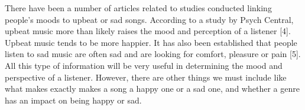 \documentclass[12pt]{report}
\begin{document}
There have been a number of articles related to studies conducted linking people’s moods to upbeat or sad songs. According to a study by Psych Central, upbeat music more than likely raises the mood and perception of a listener [4]. Upbeat music tends to be more happier. It has also been established that people listen to sad music are often sad and are looking for comfort, pleasure or pain [5]. All this type of information will be very useful in determining the mood and perspective of a listener. However, there are other things we must include like what makes exactly makes a song a happy one or a sad one, and whether a genre has an impact on being happy or sad.
\end{document}
